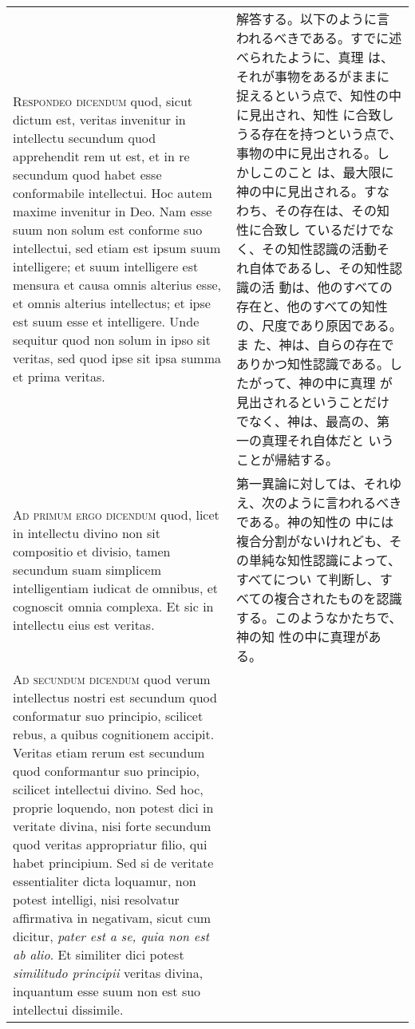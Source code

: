\documentclass[10pt]{jsarticle} %
\begin{document}
\begin{longtable}{p{21em}p{21em}}
\\

{\scshape Respondeo dicendum} quod, sicut dictum est, veritas
 invenitur in intellectu secundum quod apprehendit rem ut est, et in
 re secundum quod habet esse conformabile intellectui. Hoc autem
 maxime invenitur in Deo. Nam esse suum non solum est conforme suo
 intellectui, sed etiam est ipsum suum intelligere; et suum
 intelligere est mensura et causa omnis alterius esse, et omnis
 alterius intellectus; et ipse est suum esse et intelligere. Unde
 sequitur quod non solum in ipso sit veritas, sed quod ipse sit ipsa
 summa et prima veritas.

&

解答する。以下のように言われるべきである。すでに述べられたように、真理
は、それが事物をあるがままに捉えるという点で、知性の中に見出され、知性
に合致しうる存在を持つという点で、事物の中に見出される。しかしこのこと
は、最大限に神の中に見出される。すなわち、その存在は、その知性に合致し
ているだけでなく、その知性認識の活動それ自体であるし、その知性認識の活
動は、他のすべての存在と、他のすべての知性の、尺度であり原因である。ま
た、神は、自らの存在でありかつ知性認識である。したがって、神の中に真理
が見出されるということだけでなく、神は、最高の、第一の真理それ自体だと
いうことが帰結する。

\\

{\scshape Ad primum ergo dicendum} quod, licet in intellectu divino
 non sit compositio et divisio, tamen secundum suam simplicem
 intelligentiam iudicat de omnibus, et cognoscit omnia complexa. Et
 sic in intellectu eius est veritas.

&

第一異論に対しては、それゆえ、次のように言われるべきである。神の知性の
中には複合分割がないけれども、その単純な知性認識によって、すべてについ
て判断し、すべての複合されたものを認識する。このようなかたちで、神の知
性の中に真理がある。

\\

{\scshape Ad secundum dicendum} quod verum intellectus nostri est
 secundum quod conformatur suo principio, scilicet rebus, a quibus
 cognitionem accipit. Veritas etiam rerum est secundum quod
 conformantur suo principio, scilicet intellectui divino. Sed hoc,
 proprie loquendo, non potest dici in veritate divina, nisi forte
 secundum quod veritas appropriatur filio, qui habet principium. Sed
 si de veritate essentialiter dicta loquamur, non potest intelligi,
 nisi resolvatur affirmativa in negativam, sicut cum dicitur,
 {\itshape pater est a se, quia non est ab alio}. Et similiter dici
 potest {\itshape similitudo principii} veritas divina, inquantum esse
 suum non est suo intellectui dissimile.


\end{longtable}
\end{document}
